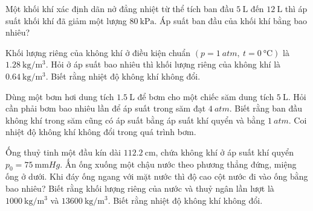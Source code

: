 \begin{ex}
	Một khối khí xác định dãn nở đẳng nhiệt từ thể tích ban đầu $\SI{5}{\liter}$ đến $\SI{12}{\liter}$ thì áp suất khối khí đã giảm một lượng $\SI{80}{\kilo\pascal}$. Áp suất ban đầu của khối khí bằng bao nhiêu?
	
\end{ex}
\begin{ex}
	Khối lượng riêng của không khí ở điều kiện chuẩn $\left(p=\SI{1}{atm},\ t=\SI{0}{\celsius}\right)$ là $\SI{1.28}{\kilogram/\meter^3}$. Hỏi ở áp suất bao nhiêu thì khối lượng riêng của không khí là $\SI{0.64}{\kilogram/\meter^3}$. Biết rằng nhiệt độ không khí không đổi.
\end{ex}
\begin{ex}
	Dùng một bơm hơi dung tích $\SI{1.5}{\liter}$ để bơm cho một chiếc săm dung tích $\SI{5}{\liter}$. Hỏi cần phải bơm bao nhiêu lần để áp suất trong săm đạt $\SI{4}{atm}$. Biết rằng ban đầu không khí trong săm cũng có áp suất bằng áp suất khí quyển và bằng $\SI{1}{atm}$. Coi nhiệt độ không khí không đổi trong quá trình bơm.
\end{ex}
\begin{ex}
	Ống thuỷ tinh một đầu kín dài $\SI{112.2}{\centi\meter}$, chứa không khí ở áp suất khí quyển $p_0=\SI{75}{\milli\meter Hg}$. Ấn ống xuống một chậu nước theo phương thẳng đứng, miệng ống ở dưới. Khi đáy ống ngang với mặt nước thì độ cao cột nước đi vào ống bằng bao nhiêu? Biết rằng khối lượng riêng của nước  và thuỷ ngân lần lượt là $\SI{1000}{\kilogram/\meter^3}$ và $\SI{13600}{\kilogram/\meter^3}$. Biết rằng nhiệt độ không khí không đổi.
\end{ex}
